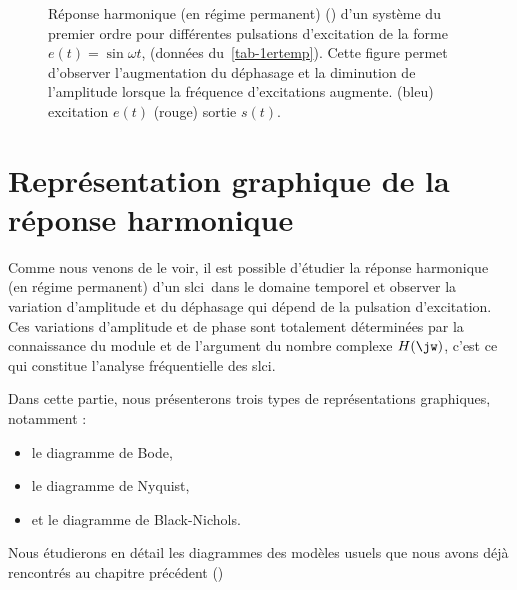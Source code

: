 \begin{figure}[!h]
\begin{center}
\caption{Réponse harmonique (en régime permanent) () d'un système du premier ordre
pour différentes pulsations d'excitation de la forme $e(t)=\sin{\omega t}$, (données du~\cref{tab-1ertemp}).
Cette figure permet d'observer l'augmentation du déphasage et la diminution 
de l'amplitude lorsque la fréquence d'excitations augmente. 
(bleu) excitation $e(t)$ (rouge) sortie $s(t)$.\label{fig-repham}}
\end{center}
\end{figure}







\newpage
\section{Représentation graphique de la réponse harmonique}

Comme nous venons de le voir, il est possible d'étudier
la réponse harmonique (en régime permanent) d'un \gls{slci}~dans le domaine 
temporel et observer la variation d'amplitude et du 
déphasage qui dépend de la pulsation d'excitation. Ces variations 
d'amplitude et de phase sont totalement déterminées par la 
connaissance du module et de l'argument du nombre complexe $H(\jw)$, c'est ce qui constitue 
l'analyse fréquentielle des \gls{slci}.

Dans cette partie, nous présenterons trois types de représentations graphiques, notamment :
\begin{itemize}
    \item le diagramme de Bode,
    \item le diagramme de Nyquist,
    \item et le diagramme de Black-Nichols. 
\end{itemize}
Nous étudierons en détail les diagrammes des 
modèles usuels que nous avons déjà rencontrés 
au chapitre précédent ()

